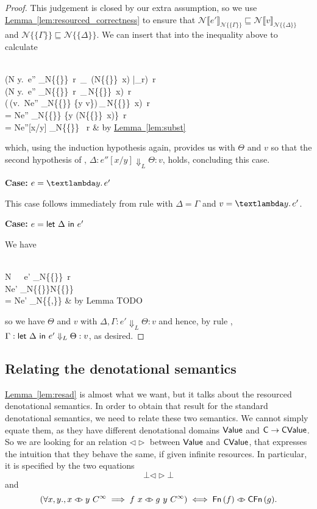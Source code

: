 \documentclass{jfp1}
\newcommand{\myref}[2]{\hyperref[#2]{#1~\ref*{#2}}}
\theoremstyle{nonumberbreak}
\newtheorem{proof}{Proof}
\newcommand{\sValue} {\text{\textsf{Value}}}
\newcommand{\sCValue}{\text{\textsf{CValue}}}
\newcommand{\sC}     {\text{\textsf{C}}}
\newcommand{\sFn}[1]{\text{\textsf{Fn}}\,(#1)}
\newcommand{\sCFn}[1]{\text{\textsf{CFn}}\,(#1)}
\newcommand{\sCFnProj}[2]{#1\,\downarrow_{\text{\textsf{CFn}}}\,#2}
\newcommand{\keyword}[1]{\text{\textsf{#1}}}
\newcommand{\sLam}[2]{\text{\textlambda} #1.\, #2}
\newcommand{\sLet}[2]{\keyword{let}~#1~\keyword{in}~#2}
\newcommand{\sred}[5]{#1 : #2 \Downarrow_{#3} #4 : #5}
\newcommand{\sRule}[1]{\text{{\textsc{#1}}}}
\newcommand{\dsemr}[2]{\mathcal N\!\llbracket #1 \rrbracket_{#2}}
\newcommand{\esemr}[1]{\mathcal N\!\!\{\!\!\!\{#1\}\!\!\!\}}
\newcommand{\dsim}{\mathrel{\triangleleft\triangleright}}
\newcommand{\Crestr}[2]{ #1 |_{#2}}
\newcommand{\case}[1]{\par\smallskip\noindent\textbf{Case:} #1\nopagebreak\par\noindent\ignorespaces}
\begin{document}
\begin{proof}
This judgement is closed by our extra assumption, so we use \myref{Lemma}{lem:resourced_correctness} to ensure that $\dsemr{e'}{\esemr{\Gamma}} \sqsubseteq \dsemr{v}{\esemr{\Delta}}$ and $\esemr{\Gamma} \sqsubseteq \esemr{\Delta}$. We can insert that into the inequality above to calculate
\begin{conteq}
\bot \\
\sqsubset   (\sCFnProj {\dsemr {\sLam y {e''}} {\esemr{\Delta}}~r                               }{\Crestr{({\esemr{\Delta}}~x)}{r}})~r \\
\sqsubseteq (\sCFnProj {\dsemr {\sLam y {e''}} {\esemr{\Delta}}~r                               }{\esemr{\Delta}~x})~r \\
\sqsubseteq (\sCFnProj {\sCFn{\lambda v.\, \dsemr {e''} {\esemr{\Delta} \sqcup \{y \mapsto v\}}}}{\esemr{\Delta}~x})~r \\
= \dsemr {e''} {\esemr{\Delta} \sqcup \{y \mapsto (\esemr{\Delta}~x)\}}~r \\
= \dsemr {e''[x/y]} {\esemr{\Delta} }~r  & by \myref{Lemma}{lem:subst}
\end{conteq}
which, using the induction hypothesis again, provides us with $\Theta$ and $v$ so that the second hypothesis of \sRule{App}, $\sred{\Delta}{e''[x/y]}L\Theta v$, holds, concluding this case.

\case{$e=\sLam y {e'}$}
This case follows immediately from rule \sRule{Lam} with $\Delta=\Gamma$ and $v = \sLam y{e'}$.

\case{$e=\sLet \Delta {e'}$}
We have
\begin{conteq}
\bot \\
\sqsubset \dsemr{\sLet \Delta {e'}}{\esemr{\Gamma}}~r \\
\sqsubseteq \dsemr{e'}{\esemr{\Delta}{\esemr{\Gamma}}} \\
= \dsemr{e'}{\esemr{\Delta,\Gamma}} & by Lemma TODO
\end{conteq}
so we have $\Theta$ and $v$ with $\sred{\Delta,\Gamma}{e'}L\Theta v$ and hence, by rule \sRule{Let}, $\sred{\Gamma}{\sLet \Delta {e'}}L\Theta v$, as desired.
\end{proof}


\subsection{Relating the denotational semantics}

\myref{Lemma}{lem:resad} is almost what we want, but it talks about the resourced denotational semantics. In order to obtain that result for the standard denotational semantics, we need to relate these two semantics. We cannot simply equate them, as they have different denotational domains $\sValue$ and $\sC\to\sCValue$. So we are looking for an relation $\dsim$ between $\sValue$ and $\sCValue$, that expresses the intuition that they behave the same, if given infinite resources. In particular, it is specified by the two equations
\[
\bot \dsim \bot
\]
and
\[
(\forall x,y., x \dsim y~C^\infty \implies f~ x \dsim g~y~C^\infty)
\iff \sFn f \dsim \sCFn g.
\]
\end{document}
